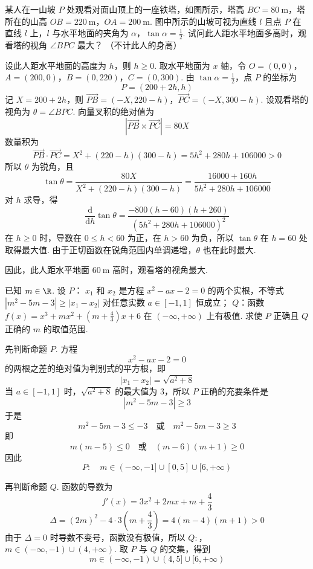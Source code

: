 \begin{problem}
某人在一山坡 \(P\) 处观看对面山顶上的一座铁塔，如图所示，塔高 \(BC = 80\mathrm{~m}\)，塔所在的山高 \(OB = 220\mathrm{~m}\)，\(OA = 200\mathrm{~m}\). 图中所示的山坡可视为直线 \(l\) 且点 \(P\) 在直线 \(l\) 上，\(l\) 与水平地面的夹角为 \(\alpha\)，\(\tan \alpha = \frac{1}{2}\). 试问此人距水平地面多高时，观看塔的视角 \(\angle BPC\) 最大？ （不计此人的身高）

\end{problem}

\begin{solution}
设此人距水平地面的高度为 \(h\)，则 \(h\geqslant0\). 取水平地面为 \(x\) 轴，令
\(O=(0,0)\)，\(A=(200,0)\)，\(B=(0,220)\)，\(C=(0,300)\).
由 \(\tan\alpha=\frac12\)，点 \(P\) 的坐标为
\[
P=(200+2h,h)
\]
记 \(X=200+2h\)，则
\(\overrightarrow{PB}=(-X,220-h)\)，\(\overrightarrow{PC}=(-X,300-h)\).
设观看塔的视角为 \(\theta=\angle BPC\). 向量叉积的绝对值为
\[
\left|\overrightarrow{PB}\times\overrightarrow{PC}\right|=80X
\]
数量积为
\[
\overrightarrow{PB}\cdot\overrightarrow{PC}
=X^2+(220-h)(300-h)
=5h^2+280h+106000>0
\]
所以 \(\theta\) 为锐角，且
\[
\tan\theta
=\frac{80X}{X^2+(220-h)(300-h)}
=\frac{16000+160h}{5h^2+280h+106000}
\]
对 \(h\) 求导，得
\[
\frac{\mathrm d}{\mathrm dh}\tan\theta
=\frac{-800(h-60)(h+260)}
{\left(5h^2+280h+106000\right)^2}
\]
在 \(h\geqslant0\) 时，导数在 \(0\leqslant h<60\) 为正，在 \(h>60\) 为负，所以 \(\tan\theta\) 在 \(h=60\) 处取得最大值. 由于正切函数在锐角范围内单调递增，\(\theta\) 也在此时最大.

因此，此人距水平地面 \(60\mathrm{~m}\) 高时，观看塔的视角最大.
\end{solution}

\begin{problem}
已知 \(m \in \R\). 设 \(P\)： \(x_1\) 和 \(x_2\) 是方程 \(x^2 - ax - 2 = 0\) 的两个实根，不等式 \(|m^2 - 5m - 3| \geqslant |x_1 - x_2|\) 对任意实数 \(a \in [-1, 1]\) 恒成立； \(Q\)：函数 \(f(x) = x^3 + mx^2 + \left(m + \frac{4}{3}\right)x + 6\) 在 \((- \infty, +\infty)\) 上有极值. 求使 \(P\) 正确且 \(Q\) 正确的 \(m\) 的取值范围.
\end{problem}

\begin{solution}
先判断命题 \(P\). 方程
\[
x^2-ax-2=0
\]
的两根之差的绝对值为判别式的平方根，即
\[
|x_1-x_2|=\sqrt{a^2+8}
\]
当 \(a\in[-1,1]\) 时，\(\sqrt{a^2+8}\) 的最大值为 \(3\)，所以 \(P\) 正确的充要条件是
\[
|m^2-5m-3|\geqslant3
\]
于是
\[
m^2-5m-3\leqslant-3
\quad\text{或}\quad
m^2-5m-3\geqslant3
\]
即
\[
m(m-5)\leqslant0
\quad\text{或}\quad
(m-6)(m+1)\geqslant0
\]
因此
\[
P:\quad m\in(-\infty,-1]\cup[0,5]\cup[6,+\infty)
\]

再判断命题 \(Q\). 函数的导数为
\[
f'(x)=3x^2+2mx+m+\frac43
\]
\[
\Delta=(2m)^2-4\cdot3\left(m+\frac43\right)=4(m-4)(m+1)>0
\]
由于 \(\Delta=0\) 时导数不变号，函数没有极值，所以
\(Q:\)，\(m\in(-\infty,-1)\cup(4,+\infty)\).
取 \(P\) 与 \(Q\) 的交集，得到
\[
m\in(-\infty,-1)\cup(4,5]\cup[6,+\infty)
\]
\end{solution}

